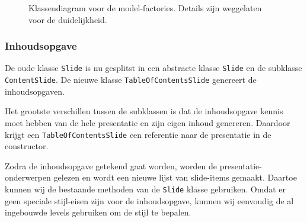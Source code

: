 \documentclass[a4paper]{article}
\newcommand{\code}[1]{\lstinline[columns=fixed]{#1}}
\begin{document}
			\begin{figure}[!htb]
			 \caption{
				Klassendiagram voor de model-factories.\label{fig:model-factories}
				Details zijn weggelaten voor de duidelijkheid.
			 }
			\end{figure}

    \subsubsection{Inhoudsopgave}
		De oude klasse \code{Slide} is nu gesplitst in een abstracte klasse \code{Slide} en de subklasse \code{ContentSlide}.
		De nieuwe klasse \code{TableOfContentsSlide} genereert de inhoudsopgaven.

		Het grootste verschillen tussen de subklassen is dat de inhoudsopgave kennis moet hebben van de hele presentatie en zijn eigen inhoud genereren.
		Daardoor krijgt een \code{TableOfContentsSlide} een referentie naar de presentatie in de constructor.

		Zodra de inhoudsopgave getekend gaat worden, worden de presentatie-onder\-werpen gelezen en wordt een nieuwe lijst van slide-items gemaakt.
		Daartoe kunnen wij de bestaande methoden van de \code{Slide} klasse gebruiken.
		Omdat er geen speciale stijl-eisen zijn voor de inhoudsopgave, kunnen wij eenvoudig de al ingebouwde levels gebruiken om de stijl te bepalen.

\end{document}
